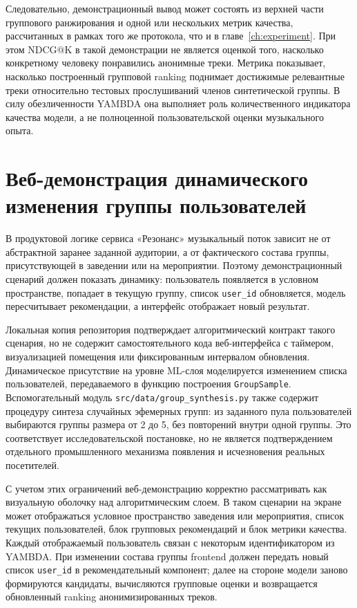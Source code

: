 Следовательно, демонстрационный вывод может состоять из верхней части группового ранжирования и одной или нескольких метрик качества, рассчитанных в рамках того же протокола, что и в главе~\ref{ch:experiment}. При этом $\mathrm{NDCG@K}$ в такой демонстрации не является оценкой того, насколько конкретному человеку понравились анонимные треки. Метрика показывает, насколько построенный групповой ranking поднимает достижимые релевантные треки относительно тестовых прослушиваний членов синтетической группы. В силу обезличенности YAMBDA она выполняет роль количественного индикатора качества модели, а не полноценной пользовательской оценки музыкального опыта.

\section{Веб-демонстрация динамического изменения группы пользователей}
\label{sec:ch6:web-demo}

В продуктовой логике сервиса «Резонанс» музыкальный поток зависит не от абстрактной заранее заданной аудитории, а от фактического состава группы, присутствующей в заведении или на мероприятии. Поэтому демонстрационный сценарий должен показать динамику: пользователь появляется в условном пространстве, попадает в текущую группу, список \texttt{user\_id} обновляется, модель пересчитывает рекомендации, а интерфейс отображает новый результат.

Локальная копия репозитория подтверждает алгоритмический контракт такого сценария, но не содержит самостоятельного кода веб-интерфейса с таймером, визуализацией помещения или фиксированным интервалом обновления. Динамическое присутствие на уровне ML-слоя моделируется изменением списка пользователей, передаваемого в функцию построения \texttt{GroupSample}. Вспомогательный модуль \texttt{src/data/group\_synthesis.py} также содержит процедуру синтеза случайных эфемерных групп: из заданного пула пользователей выбираются группы размера от 2 до 5, без повторений внутри одной группы. Это соответствует исследовательской постановке, но не является подтверждением отдельного промышленного механизма появления и исчезновения реальных посетителей.

С учетом этих ограничений веб-демонстрацию корректно рассматривать как визуальную оболочку над алгоритмическим слоем. В таком сценарии на экране может отображаться условное пространство заведения или мероприятия, список текущих пользователей, блок групповых рекомендаций и блок метрики качества. Каждый отображаемый пользователь связан с некоторым идентификатором из YAMBDA. При изменении состава группы frontend должен передать новый список \texttt{user\_id} в рекомендательный компонент; далее на стороне модели заново формируются кандидаты, вычисляются групповые оценки и возвращается обновленный ranking анонимизированных треков.

